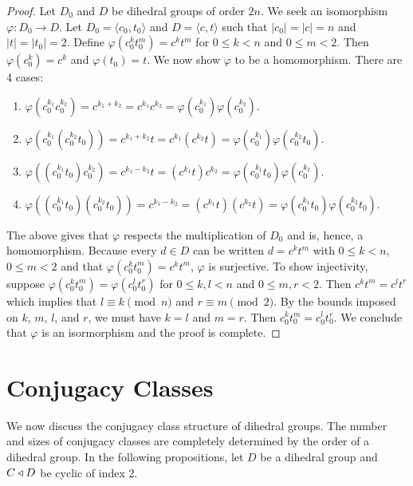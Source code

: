 \documentclass[main.tex]{subfiles}
\begin{document}
\begin{proof}
Let $D_0$ and $D$ be dihedral groups of order $2n$. We seek an isomorphism $\varphi: D_0 \to D$. Let $D_0 = \langle c_0, t_0 \rangle$ and $D = \langle c, t \rangle$ such that $|c_0| = |c| = n$ and $|t| = |t_0| = 2$. Define $\varphi(c_0^k t_0^m) = c^k t^m$ for $0 \le k < n$ and $0 \le m < 2$. Then $\varphi(c_0^k) = c^k$ and $\varphi(t_0) = t$. We now show $\varphi$ to be a homomorphism. There are 4 cases:
\begin{enumerate}
	\item $\varphi(c_0^{k_1} c_0^{k_2}) = c^{k_1 + k_2} = c^{k_1} c^{k_2} = \varphi(c_0^{k_1}) \varphi(c_0^{k_2})$.
	\item $\varphi(c_0^{k_1} (c_0^{k_2} t_0)) =  c^{k_1+k_2} t = c^{k_1} (c^{k_2} t) = \varphi(c_0^{k_1}) \varphi(c_0^{k_2} t_0)$.
	\item $\varphi((c_0^{k_1} t_0) c_0^{k_2}) = c^{k_1 - k_2} t = (c^{k_1} t) c^{k_2} = \varphi(c_0^{k_1} t_0) \varphi(c_0^{k_2})$.
	\item $\varphi((c_0^{k_1} t_0) (c_0^{k_2} t_0)) = c^{k_1 - k_2} = (c^{k_1} t) (c^{k_2} t) = \varphi(c_0^{k_1} t_0) \varphi(c_0^{k_2} t_0)$.
\end{enumerate}
The above gives that $\varphi$ respects the multiplication of $D_0$ and is, hence, a homomorphism. Because every $d \in D$ can be written $d = c^k t^m$ with $0 \le k < n$, $0 \le m < 2$ and that $\varphi(c_0^k t_0^m) = c^k t^m$,  $\varphi$ is surjective. To show injectivity, suppose $\varphi(c_0^k t_0^m) = \varphi(c_0^l t_0^r)$ for $0 \le k, l < n$ and $0 \le m, r < 2$. Then $c^k t^m = c^l t^r$ which implies that $l \equiv k \pmod n$ and $r \equiv m \pmod 2$. By the bounds imposed on $k$, $m$, $l$, and $r$, we must have $k = l$ and $m = r$.  Then $c_0^k t_0^m = c_0^l t_0^r$. We conclude that $\varphi$ is an isormorphism and the proof is complete.
\end{proof}

\hss

\section{Conjugacy Classes}

\hss

We now discuss the conjugacy class structure of dihedral groups. The number and sizes of conjugacy classes are completely determined by the order of a dihedral group. In the following propositions, let $D$ be a dihedral group and $C \triangleleft D$ be cyclic of index 2.
\end{document}
